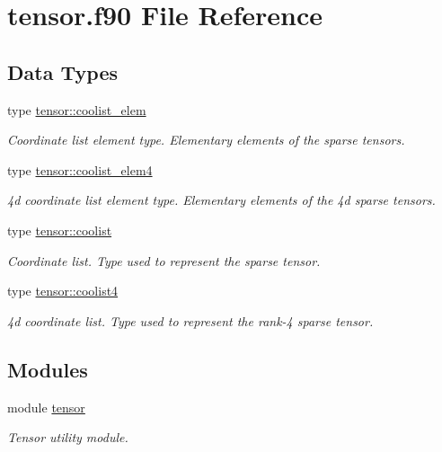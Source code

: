 \hypertarget{tensor_8f90}{}\section{tensor.\+f90 File Reference}
\label{tensor_8f90}
\subsection*{Data Types}
\begin{DoxyCompactItemize}
\item 
type \hyperlink{structtensor_1_1coolist__elem}{tensor\+::coolist\+\_\+elem}
\begin{DoxyCompactList}\small\item\em Coordinate list element type. Elementary elements of the sparse tensors. \end{DoxyCompactList}\item 
type \hyperlink{structtensor_1_1coolist__elem4}{tensor\+::coolist\+\_\+elem4}
\begin{DoxyCompactList}\small\item\em 4d coordinate list element type. Elementary elements of the 4d sparse tensors. \end{DoxyCompactList}\item 
type \hyperlink{structtensor_1_1coolist}{tensor\+::coolist}
\begin{DoxyCompactList}\small\item\em Coordinate list. Type used to represent the sparse tensor. \end{DoxyCompactList}\item 
type \hyperlink{structtensor_1_1coolist4}{tensor\+::coolist4}
\begin{DoxyCompactList}\small\item\em 4d coordinate list. Type used to represent the rank-\/4 sparse tensor. \end{DoxyCompactList}\end{DoxyCompactItemize}
\subsection*{Modules}
\begin{DoxyCompactItemize}
\item 
module \hyperlink{namespacetensor}{tensor}
\begin{DoxyCompactList}\small\item\em Tensor utility module. \end{DoxyCompactList}\end{DoxyCompactItemize}
